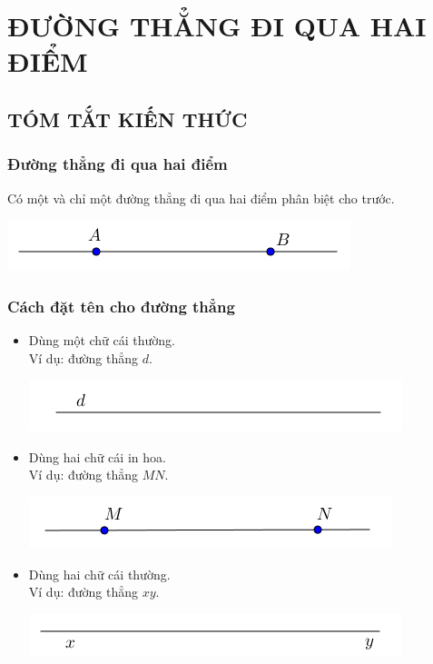 \section{ĐƯỜNG THẲNG ĐI QUA HAI ĐIỂM}
\subsection{TÓM TẮT KIẾN THỨC}
\begin{tomtat}
	\subsubsection{Đường thẳng đi qua hai điểm}
Có một và chỉ một đường thẳng đi qua hai điểm phân biệt cho trước.
\begin{center}
\includegraphics[scale=0.7]{img/bai3_h1}
\end{center}
	\subsubsection{Cách đặt tên cho đường thẳng}
\begin{itemize} 
		\item Dùng một chữ cái thường.\\
		Ví dụ: đường thẳng $d$.
		\begin{center}
			\includegraphics[scale=0.7]{img/bai3_vd1}
			\end{center}
		\item Dùng hai chữ cái in hoa.\\
		Ví dụ: đường thẳng $MN$.
		\begin{center}
			\includegraphics[scale=0.7]{img/bai3_vd2}
			\end{center}
		\item Dùng hai chữ cái thường.\\
		Ví dụ: đường thẳng $xy$.
			\begin{center}
			\includegraphics[scale=0.7]{img/bai3_vd3}
			\end{center}
\end{itemize}

\end{tomtat}
